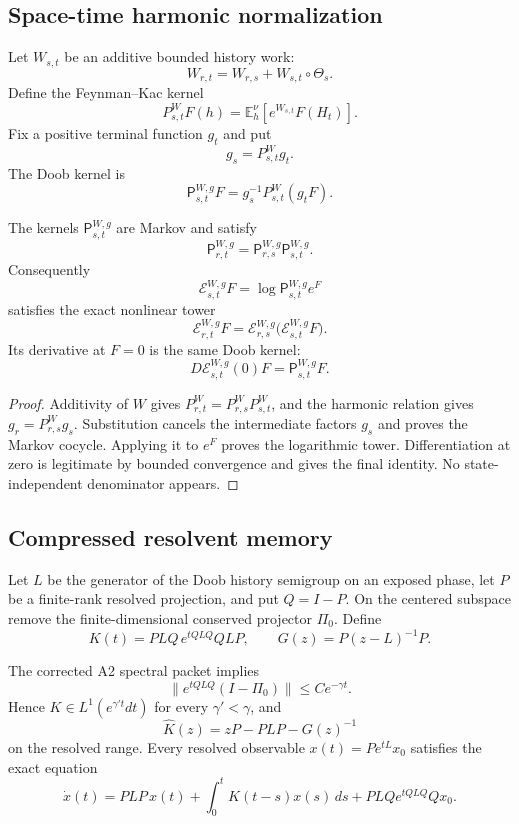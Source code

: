 \subsection{Space-time harmonic normalization}

Let \(W_{s,t}\) be an additive bounded history work:
\[
 W_{r,t}=W_{r,s}+W_{s,t}\circ\Theta_s.
\]
Define the Feynman--Kac kernel
\[
 P^W_{s,t}F(h)
 =\mathbb E_h^\nu[e^{W_{s,t}}F(H_t)].
\]
Fix a positive terminal function \(g_t\) and put
\[
 g_s=P^W_{s,t}g_t.
\]
The Doob kernel is
\[
 {\mathsf P}^{W,g}_{s,t}F
 =g_s^{-1}P^W_{s,t}(g_tF).
\]

\begin{proposition}
\label{prop:r5-a4-doob}
The kernels \({\mathsf P}^{W,g}_{s,t}\) are Markov and satisfy
\[
 {\mathsf P}^{W,g}_{r,t}
 ={\mathsf P}^{W,g}_{r,s}{\mathsf P}^{W,g}_{s,t}.
\]
Consequently
\[
 {\mathcal E}^{W,g}_{s,t}F
 =\log{\mathsf P}^{W,g}_{s,t}e^F
\]
satisfies the exact nonlinear tower
\[
 {\mathcal E}^{W,g}_{r,t}F
 ={\mathcal E}^{W,g}_{r,s}
   \bigl({\mathcal E}^{W,g}_{s,t}F\bigr).
\]
Its derivative at \(F=0\) is the same Doob kernel:
\[
 D{\mathcal E}^{W,g}_{s,t}(0)F
 ={\mathsf P}^{W,g}_{s,t}F.
\]
\end{proposition}

\begin{proof}
Additivity of \(W\) gives
\(P^W_{r,t}=P^W_{r,s}P^W_{s,t}\), and the harmonic relation gives
\(g_r=P^W_{r,s}g_s\).  Substitution cancels the intermediate factors \(g_s\)
and proves the Markov cocycle.  Applying it to \(e^F\) proves the logarithmic
tower.  Differentiation at zero is legitimate by bounded convergence and
gives the final identity.  No state-independent denominator appears.
\end{proof}

\subsection{Compressed resolvent memory}

Let \(L\) be the generator of the Doob history semigroup on an exposed phase,
let \(P\) be a finite-rank resolved projection, and put \(Q=I-P\).  On the
centered subspace remove the finite-dimensional conserved projector
\(\Pi_0\).  Define
\[
 K(t)=PLQ\,e^{tQLQ}QLP,\qquad
 G(z)=P(z-L)^{-1}P.
\]

\begin{theorem}
\label{thm:r5-a4-memory}
The corrected A2 spectral packet implies
\[
 \|e^{tQLQ}(I-\Pi_0)\|\le Ce^{-\gamma t}.
\]
Hence \(K\in L^1(e^{\gamma' t}dt)\) for every \(\gamma'<\gamma\), and
\[
 \widehat K(z)
 =zP-PLP-G(z)^{-1}
\]
on the resolved range.  Every resolved observable \(x(t)=Pe^{tL}x_0\)
satisfies the exact equation
\[
 \dot x(t)=PLP\,x(t)+\int_0^tK(t-s)x(s)\,ds
           +PLQe^{tQLQ}Qx_0.
\]
\end{theorem}

